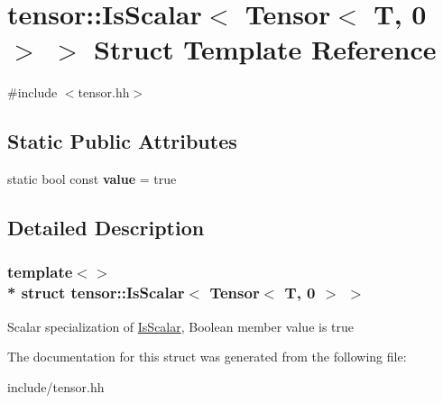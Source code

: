 \hypertarget{structtensor_1_1IsScalar_3_01Tensor_3_01T_00_010_01_4_01_4}{}\section{tensor\+:\+:Is\+Scalar$<$ Tensor$<$ T, 0 $>$ $>$ Struct Template Reference}
\label{structtensor_1_1IsScalar_3_01Tensor_3_01T_00_010_01_4_01_4}


{\ttfamily \#include $<$tensor.\+hh$>$}

\subsection*{Static Public Attributes}
\begin{DoxyCompactItemize}
\item 
static bool const {\bfseries value} = true\hypertarget{structtensor_1_1IsScalar_3_01Tensor_3_01T_00_010_01_4_01_4_aa838535103dcc43f84505f3d64be38ce}{}\label{structtensor_1_1IsScalar_3_01Tensor_3_01T_00_010_01_4_01_4_aa838535103dcc43f84505f3d64be38ce}

\end{DoxyCompactItemize}


\subsection{Detailed Description}
\subsubsection*{template$<$$>$\\*
struct tensor\+::\+Is\+Scalar$<$ Tensor$<$ T, 0 $>$ $>$}

Scalar specialization of \hyperlink{structtensor_1_1IsScalar}{Is\+Scalar}, Boolean member {\ttfamily value} is true 

The documentation for this struct was generated from the following file\+:\begin{DoxyCompactItemize}
\item 
include/tensor.\+hh\end{DoxyCompactItemize}
